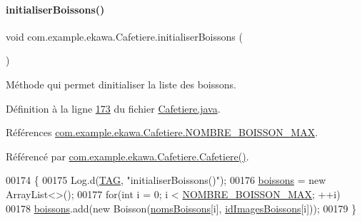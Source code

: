 \paragraph{\texorpdfstring{initialiser\+Boissons()}{initialiserBoissons()}}
{\footnotesize\ttfamily void com.\+example.\+ekawa.\+Cafetiere.\+initialiser\+Boissons (\begin{DoxyParamCaption}{ }\end{DoxyParamCaption})\hspace{0.3cm}{\ttfamily [private]}}



Méthode qui permet d\textquotesingle{}initialiser la liste des boissons. 



Définition à la ligne \hyperlink{_cafetiere_8java_source_l00173}{173} du fichier \hyperlink{_cafetiere_8java_source}{Cafetiere.\+java}.



Références \hyperlink{_cafetiere_8java_source_l00030}{com.\+example.\+ekawa.\+Cafetiere.\+N\+O\+M\+B\+R\+E\+\_\+\+B\+O\+I\+S\+S\+O\+N\+\_\+\+M\+AX}.



Référencé par \hyperlink{_cafetiere_8java_source_l00108}{com.\+example.\+ekawa.\+Cafetiere.\+Cafetiere()}.


\begin{DoxyCode}
00174     \{
00175         Log.d(\hyperlink{classcom_1_1example_1_1ekawa_1_1_cafetiere_aa0c1fd99a2508b06c462aea17034aa91}{TAG}, \textcolor{stringliteral}{"initialiserBoissons()"});
00176         \hyperlink{classcom_1_1example_1_1ekawa_1_1_cafetiere_aad375efbc01f1db83572f4ae567189de}{boissons} = \textcolor{keyword}{new} ArrayList<>();
00177         \textcolor{keywordflow}{for}(\textcolor{keywordtype}{int} i = 0; i < \hyperlink{classcom_1_1example_1_1ekawa_1_1_cafetiere_a2be5950bf3bb155b8396593d390b808b}{NOMBRE\_BOISSON\_MAX}; ++i)
00178             \hyperlink{classcom_1_1example_1_1ekawa_1_1_cafetiere_aad375efbc01f1db83572f4ae567189de}{boissons}.add(\textcolor{keyword}{new} Boisson(\hyperlink{classcom_1_1example_1_1ekawa_1_1_cafetiere_a59db420b33a9f03aad97d6cad4f87c03}{nomsBoissons}[i], 
      \hyperlink{classcom_1_1example_1_1ekawa_1_1_cafetiere_a10645115a166d3529e63aeb4ea16a869}{idImagesBoissons}[i]));
00179     \}
\end{DoxyCode}
\mbox{\label{classcom_1_1example_1_1ekawa_1_1_cafetiere_a75d0df422427eed8b12e7b46a6e11a35}} 
